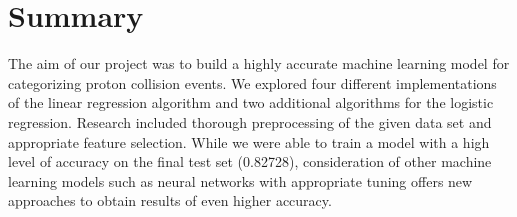 \documentclass[10pt,conference,compsocconf]{IEEEtran}
\begin{document}
\section{Summary}

The aim of our project was to build a highly accurate machine learning model for categorizing proton collision events. We explored four different implementations of the linear regression algorithm and two additional algorithms for the logistic regression. Research included thorough preprocessing of the given data set and appropriate feature selection. While we were able to train a model with a high level of accuracy on the final test set (0.82728), consideration of other machine learning models such as neural networks with appropriate tuning offers new approaches to obtain results of even higher accuracy.
\end{document}
